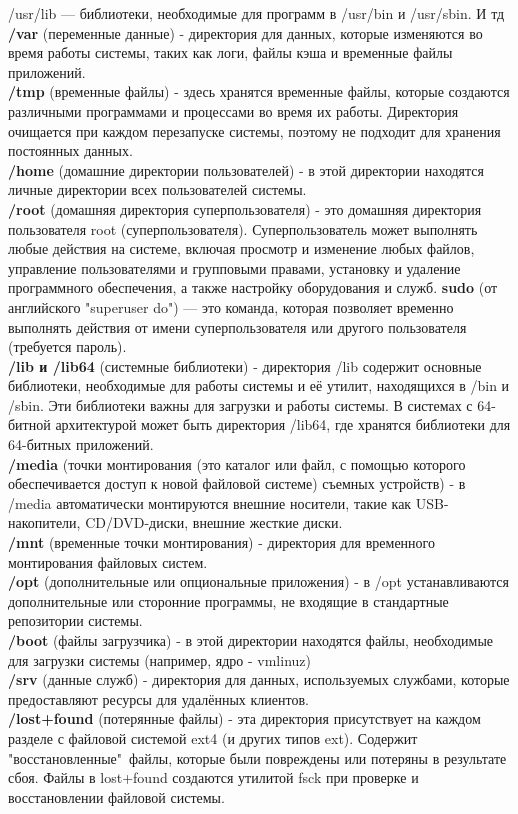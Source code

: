 /usr/lib — библиотеки, необходимые для программ в /usr/bin и /usr/sbin. И тд \\
\textbf{/var} (переменные данные) - директория для данных, которые изменяются во время работы системы, таких как логи, файлы кэша и временные файлы приложений. \\
\textbf{/tmp} (временные файлы) - здесь хранятся временные файлы, которые создаются различными программами и процессами во время их работы. Директория очищается при каждом перезапуске системы, поэтому не подходит для хранения постоянных данных. \\
\textbf{/home} (домашние директории пользователей) - в этой директории находятся личные директории всех пользователей системы. \\
\textbf{/root} (домашняя директория суперпользователя) - 
это домашняя директория пользователя root (суперпользователя). Суперпользователь может выполнять любые действия на системе, включая просмотр и изменение любых файлов, управление пользователями и групповыми правами, установку и удаление программного обеспечения, а также настройку оборудования и служб. \textbf{sudo} (от английского "superuser do") — это команда, которая позволяет временно выполнять действия от имени суперпользователя или другого пользователя (требуется пароль). \\
\textbf{/lib и /lib64} (системные библиотеки) - директория /lib содержит основные библиотеки, необходимые для работы системы и её утилит, находящихся в /bin и /sbin. Эти библиотеки важны для загрузки и работы системы. В системах с 64-битной архитектурой может быть директория /lib64, где хранятся библиотеки для 64-битных приложений. \\
\textbf{/media} (точки монтирования (это каталог или файл, с помощью которого обеспечивается доступ к новой файловой системе) съемных устройств) - в /media автоматически монтируются внешние носители, такие как USB-накопители, CD/DVD-диски, внешние жесткие диски. \\
\textbf{/mnt} (временные точки монтирования) - директория для временного монтирования файловых систем. \\
\textbf{/opt} (дополнительные или опциональные приложения) - в /opt устанавливаются дополнительные или сторонние программы, не входящие в стандартные репозитории системы. \\
\textbf{/boot} (файлы загрузчика) - в этой директории находятся файлы, необходимые для загрузки системы (например, ядро - vmlinuz) \\
\textbf{/srv} (данные служб) - директория для данных, используемых службами, которые предоставляют ресурсы для удалённых клиентов. \\
\textbf{/lost+found} (потерянные файлы) - эта директория присутствует на каждом разделе с файловой системой ext4 (и других типов ext). Содержит "восстановленные"\, файлы, которые были повреждены или потеряны в результате сбоя. Файлы в lost+found создаются утилитой fsck при проверке и восстановлении файловой системы. \\

